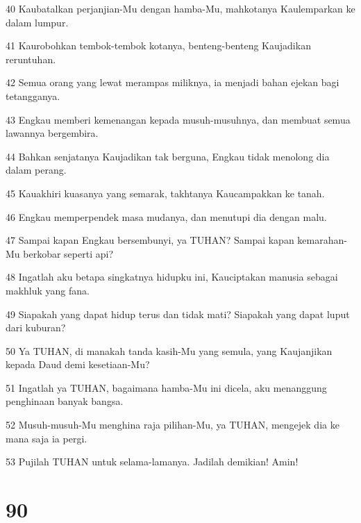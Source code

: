 \par 40 Kaubatalkan perjanjian-Mu dengan hamba-Mu, mahkotanya Kaulemparkan ke dalam lumpur.
\par 41 Kaurobohkan tembok-tembok kotanya, benteng-benteng Kaujadikan reruntuhan.
\par 42 Semua orang yang lewat merampas miliknya, ia menjadi bahan ejekan bagi tetangganya.
\par 43 Engkau memberi kemenangan kepada musuh-musuhnya, dan membuat semua lawannya bergembira.
\par 44 Bahkan senjatanya Kaujadikan tak berguna, Engkau tidak menolong dia dalam perang.
\par 45 Kauakhiri kuasanya yang semarak, takhtanya Kaucampakkan ke tanah.
\par 46 Engkau memperpendek masa mudanya, dan menutupi dia dengan malu.
\par 47 Sampai kapan Engkau bersembunyi, ya TUHAN? Sampai kapan kemarahan-Mu berkobar seperti api?
\par 48 Ingatlah aku betapa singkatnya hidupku ini, Kauciptakan manusia sebagai makhluk yang fana.
\par 49 Siapakah yang dapat hidup terus dan tidak mati? Siapakah yang dapat luput dari kuburan?
\par 50 Ya TUHAN, di manakah tanda kasih-Mu yang semula, yang Kaujanjikan kepada Daud demi kesetiaan-Mu?
\par 51 Ingatlah ya TUHAN, bagaimana hamba-Mu ini dicela, aku menanggung penghinaan banyak bangsa.
\par 52 Musuh-musuh-Mu menghina raja pilihan-Mu, ya TUHAN, mengejek dia ke mana saja ia pergi.
\par 53 Pujilah TUHAN untuk selama-lamanya. Jadilah demikian! Amin!

\chapter{90}

